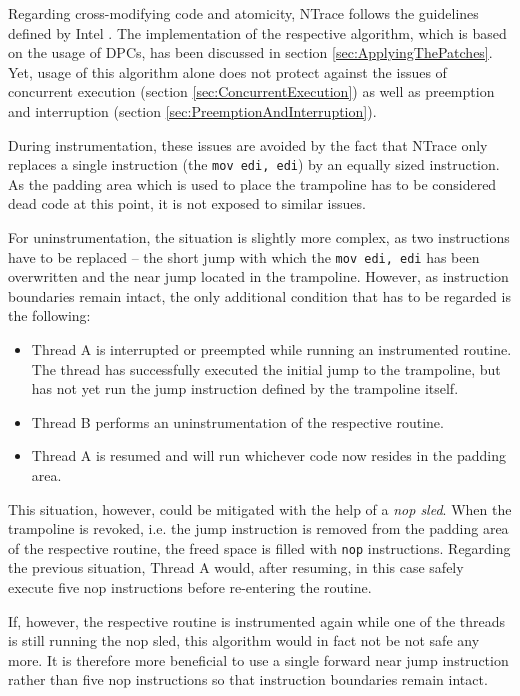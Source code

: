 Regarding cross-modifying code and atomicity, NTrace follows the guidelines defined by 
Intel \cite{intel07_3A}. The implementation of the respective algorithm, which is based on
the usage of DPCs, has been discussed in section \ref{sec:ApplyingThePatches}.
Yet, usage of this algorithm alone does not protect against the issues of concurrent 
execution (section \ref{sec:ConcurrentExecution}) as well as preemption and interruption 
(section \ref{sec:PreemptionAndInterruption}). 

During instrumentation, these issues are
avoided by the fact that NTrace only replaces a single instruction (the \verb|mov edi, edi|)
by an equally sized instruction. As the padding area which is used to place the trampoline
has to be considered dead code at this point, it is not exposed to similar issues.

For uninstrumentation, the situation is slightly more complex, as two instructions have
to be replaced -- the short jump with which the \verb|mov edi, edi| has been overwritten and
the near jump located in the trampoline. However, as instruction boundaries remain intact, the only additional
condition that has to be regarded is the following:

\begin{itemize}
	\item Thread A is interrupted or preempted while running an instrumented routine. The thread
				has successfully executed the initial jump to the trampoline, but has not yet run
				the jump instruction defined by the trampoline itself. 
	\item Thread B performs an uninstrumentation of the respective routine. 
	\item Thread A is resumed and will run whichever code now resides in the padding area. 
\end{itemize}

This situation, however, could be mitigated with the help of a \emph{nop sled}. When the
trampoline is revoked, i.e. the jump instruction is removed from the padding area of the respective
routine, the freed space is filled with \verb|nop| instructions. Regarding the previous 
situation, Thread A would, after resuming, in this case safely execute five nop instructions before re-entering
the routine.

If, however, the respective routine is instrumented again while one of the threads is still 
running the nop sled, this algorithm would in fact not be not safe any more. It is therefore
more beneficial to use a single forward near jump instruction 
rather than five nop instructions so that instruction boundaries remain intact.

